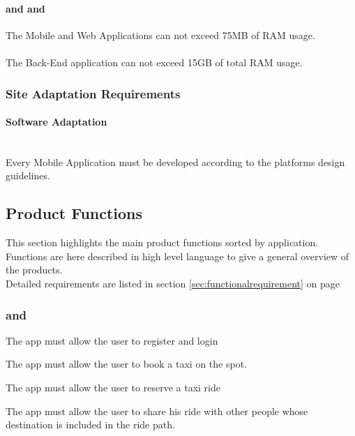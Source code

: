 \label{ssub:memory_constrains}
\paragraph{ and  and  }
The Mobile and Web Applications can not exceed 75MB of RAM usage.
\paragraph{}
The Back-End application can not exceed 15GB of total RAM usage.

\subsubsection{Site Adaptation Requirements} 
\label{ssub:site_adaptation_requirements}
\paragraph{Software Adaptation} \mbox{} \\
Every Mobile Application must be developed according to the platforms design guidelines.

\subsection{Product Functions} 
\label{sub:product_functions}
This section highlights the main product functions sorted by application.\\
Functions are here described in high level language to give a general overview of the products.\\
Detailed requirements are listed in section \ref{sec:functionalrequirement} on page \pageref{sec:functionalrequirement}

\subsubsection{ and }
\label{ssub:web_application_and_mobile_application_}
\begin{enumerate} [label = \textbf{[F\arabic*]}]
	\item The app must allow the user to register and login
	\item  The app must allow the user to book a taxi on the spot.
	\item  The app must allow the user to reserve a taxi ride
	\item  The app must allow the user to share his ride with other people whose destination is included in the ride path.
\end{enumerate}

